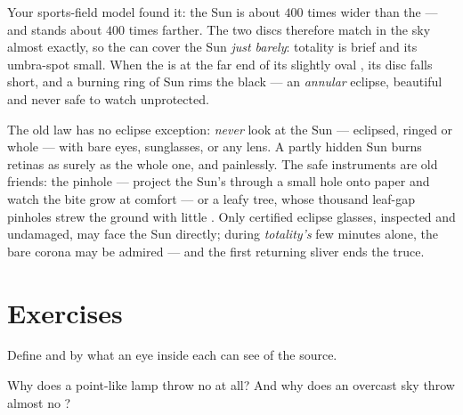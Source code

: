 \begin{example}\label{ex:g7:shadows-eclipses:coincidence}
Your sports-field model found it: the Sun is about $400$ times
wider than the  --- and stands about $400$ times farther.
The two discs therefore match in the sky almost exactly, so the
 can cover the Sun \emph{just barely}: totality is brief and
its umbra-spot small. When the  is at the far end of its
slightly oval , its disc falls short, and a burning ring of
Sun rims the black  --- an \emph{annular} eclipse, beautiful
and never safe to watch unprotected.
\end{example}

\begin{remark}\label{rem:g7:shadows-eclipses:safety}
The old law has no eclipse exception: \emph{never} look at the
Sun --- eclipsed, ringed or whole --- with bare eyes,
sunglasses, or any lens. A partly hidden Sun burns retinas as
surely as the whole one, and painlessly. The safe instruments
are old friends: the pinhole --- project the Sun's  through
a small hole onto paper and watch the bite grow at comfort ---
or a leafy tree, whose thousand leaf-gap pinholes strew the
ground with little . Only certified eclipse glasses,
inspected and undamaged, may face the Sun directly; during
\emph{totality's} few minutes alone, the bare corona may be
admired --- and the first returning sliver ends the truce.
\end{remark}

\section{Exercises}

\begin{exercise}[$\star$]\label{exo:g7:shadows-eclipses:1}
Define  and  by what an eye inside each can see of
the source.
\end{exercise}

\begin{exercise}[$\star$]\label{exo:g7:shadows-eclipses:2}
Why does a point-like lamp throw no  at all? And why
does an overcast sky throw almost no ?
\end{exercise}

